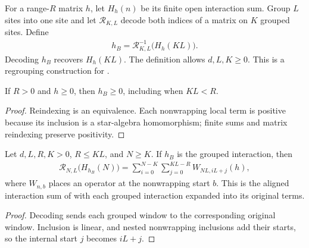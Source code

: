 \begin{definition}
    \label{def:blocked_interaction_matrix}
    \leanok
    For a range-$R$ matrix $h$, let $H_h(n)$ be its finite open interaction
    sum. Group $L$ sites into one site and let $\mathcal R_{K,L}$ decode
    both indices of a matrix on $K$ grouped sites. Define
    \begin{align}
        h_B=\mathcal R_{K,L}^{-1}\bigl(H_h(KL)\bigr).
    \end{align}
    Decoding $h_B$ recovers $H_h(KL)$. The definition allows $d,L,K\geq0$. This is a regrouping construction for
    \cite[Section~3, equations~(3.12)--(3.14)]{Nachtergaele1996Spectral}.
\end{definition}

\begin{lemma}
    \label{thm:blocked_interaction_matrix_posSemidef}
    \leanok
    If $R>0$ and $h\geq0$, then $h_B\geq0$, including when $KL<R$.
\end{lemma}
\begin{proof}\leanok
    Reindexing is an equivalence. Each nonwrapping local term is positive
    because its inclusion is a star-algebra homomorphism; finite sums and
    matrix reindexing preserve positivity.
\end{proof}

\begin{lemma}
    \label{thm:blocked_interaction_expansion}
    \leanok
    Let $d,L,R,K>0$, $R\leq KL$, and $N\geq K$. If $h_B$ is the grouped
    interaction, then
    \begin{align}
        \mathcal R_{N,L}\bigl(H_{h_B}(N)\bigr)
        =\sum_{i=0}^{N-K}\sum_{j=0}^{KL-R}W_{NL,iL+j}(h),
    \end{align}
    where $W_{n,b}$ places an operator at the nonwrapping start $b$.
    This is the aligned interaction sum of
    \cite[equation~(3.12)]{Nachtergaele1996Spectral} with each grouped
    interaction expanded into its original terms.
\end{lemma}
\begin{proof}\leanok
    Decoding sends each grouped window to the corresponding original
    window. Inclusion is linear, and nested nonwrapping inclusions add
    their starts, so the internal start $j$ becomes $iL+j$.
\end{proof}

